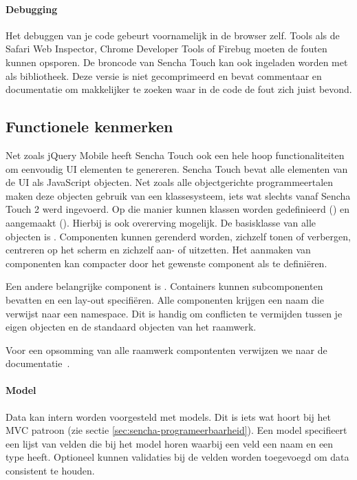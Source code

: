 \paragraph{Debugging}
Het debuggen van je code gebeurt voornamelijk in de browser zelf.  
Tools als de Safari Web Inspector,  Chrome Developer Tools of Firebug moeten de fouten kunnen opsporen.  
De broncode van Sencha Touch kan ook ingeladen worden met  als bibliotheek.  
Deze versie is niet gecomprimeerd en bevat commentaar en documentatie om makkelijker te zoeken waar in de code de fout zich juist bevond.

\subsection{Functionele kenmerken}
Net zoals jQuery Mobile heeft Sencha Touch ook een hele hoop functionaliteiten om eenvoudig UI elementen te genereren.  
Sencha Touch bevat alle elementen van de UI als JavaScript objecten.  
Net zoals alle objectgerichte programmeertalen maken deze objecten gebruik van een klassesysteem,  iets wat slechts vanaf Sencha Touch 2 werd ingevoerd.  
Op die manier kunnen klassen worden gedefinieerd () en aangemaakt ().  
Hierbij is ook overerving mogelijk.  
De basisklasse van alle objecten is .  
Componenten kunnen gerenderd worden, zichzelf tonen of verbergen,  centreren op het scherm en zichzelf aan- of uitzetten.   
Het aanmaken van componenten kan compacter door het gewenste component als  te definiëren.  

Een andere belangrijke component is .  
Containers kunnen subcomponenten bevatten en een lay-out specifiëren.  
Alle componenten krijgen een naam die verwijst naar een namespace.  
Dit is handig om conflicten te vermijden tussen je eigen objecten en de standaard objecten van het raamwerk.  

Voor een opsomming van alle raamwerk compontenten verwijzen we naar de documentatie~\cite{Inc.2013a}.


\paragraph{Model}
Data kan intern worden voorgesteld met models.  
Dit is iets wat hoort bij het MVC patroon (zie sectie \ref{sec:sencha-programeerbaarheid}).  
Een model specifieert een lijst van velden die bij het model horen waarbij een veld een naam en een type heeft.  
Optioneel kunnen validaties bij de velden worden toegevoegd om data consistent te houden.  

